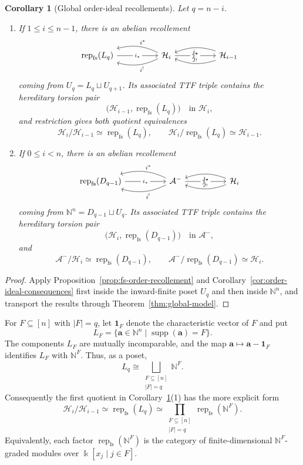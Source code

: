 \documentclass[12pt,reqno]{amsart}
\newtheorem{corollary}[theorem]{Corollary}
\theoremstyle{definition}
\theoremstyle{remark}
\newcommand{\Rep}{\operatorname{rep}}
\begin{document}
\begin{corollary}[Global order-ideal recollements]
\label{cor:global-complementary-recollements}
Let $q=n-i$.
\begin{enumerate}[label=\rm(\arabic*)]
\item If $1\le i\le n-1$, there is an abelian recollement
\[
\begin{tikzcd}[column sep=5.0em]
\Rep_{\mathrm{fs}}(L_q)
  \arrow[r, "i_*" description]
& \mathcal H_i
  \arrow[l, bend right=20, "i^*"']
  \arrow[l, bend left=20, "i^!"]
  \arrow[r, "j^*" description]
& \mathcal H_{i-1}
  \arrow[l, bend left=20, "j_!"']
  \arrow[l, bend right=20, "j_*"]
\end{tikzcd}
\]
coming from $U_q=L_q\sqcup U_{q+1}$.
Its associated TTF triple contains the hereditary torsion pair
\[
\bigl(\mathcal H_{i-1},\Rep_{\mathrm{fs}}(L_q)\bigr)
\quad\text{in }\mathcal H_i,
\]
and restriction gives both quotient equivalences
\[
\mathcal H_i/\mathcal H_{i-1}\simeq\Rep_{\mathrm{fs}}(L_q),
\qquad
\mathcal H_i/\Rep_{\mathrm{fs}}(L_q)\simeq\mathcal H_{i-1}.
\]
\item If $0\le i<n$, there is an abelian recollement
\[
\begin{tikzcd}[column sep=5.0em]
\Rep_{\mathrm{fs}}(D_{q-1})
  \arrow[r, "i_*" description]
& \mathcal A^-
  \arrow[l, bend right=20, "i^*"']
  \arrow[l, bend left=20, "i^!"]
  \arrow[r, "j^*" description]
& \mathcal H_i
  \arrow[l, bend left=20, "j_!"']
  \arrow[l, bend right=20, "j_*"]
\end{tikzcd}
\]
coming from $\mathbb N^n=D_{q-1}\sqcup U_q$.
Its associated TTF triple contains the hereditary torsion pair
\[
\bigl(\mathcal H_i,\Rep_{\mathrm{fs}}(D_{q-1})\bigr)
\quad\text{in }\mathcal A^-,
\]
and
\[
\mathcal A^-/\mathcal H_i\simeq\Rep_{\mathrm{fs}}(D_{q-1}),
\qquad
\mathcal A^-/\Rep_{\mathrm{fs}}(D_{q-1})\simeq\mathcal H_i.
\]
\end{enumerate}
\end{corollary}

\begin{proof}
Apply Proposition~\ref{prop:fs-order-recollement} and
Corollary~\ref{cor:order-ideal-consequences} first inside the inward-finite
poset $U_q$ and then inside $\mathbb N^n$, and transport the results through
Theorem~\ref{thm:global-model}.
\end{proof}

For $F\subseteq[n]$ with $|F|=q$, let $\mathbf1_F$ denote the
characteristic vector of $F$ and put
\[
L_F=\{\mathbf a\in\mathbb N^n\mid\operatorname{supp}(\mathbf a)=F\}.
\]
The components $L_F$ are mutually incomparable, and the map
$\mathbf a\mapsto\mathbf a-\mathbf1_F$ identifies $L_F$ with
$\mathbb N^F$.  Thus, as a poset,
\[
L_q\cong\bigsqcup_{\substack{F\subseteq[n]\\|F|=q}}\mathbb N^F.
\]
Consequently the first quotient in
Corollary~\ref{cor:global-complementary-recollements}(1) has the more explicit
form
\[
\mathcal H_i/\mathcal H_{i-1}
\simeq\Rep_{\mathrm{fs}}(L_q)
\simeq
\prod_{\substack{F\subseteq[n]\\|F|=q}}
\Rep_{\mathrm{fs}}(\mathbb N^F).
\]
Equivalently, each factor $\Rep_{\mathrm{fs}}(\mathbb N^F)$ is the category
of finite-dimensional $\mathbb N^F$-graded modules over
$\Bbbk[x_j\mid j\in F]$.
\end{document}
